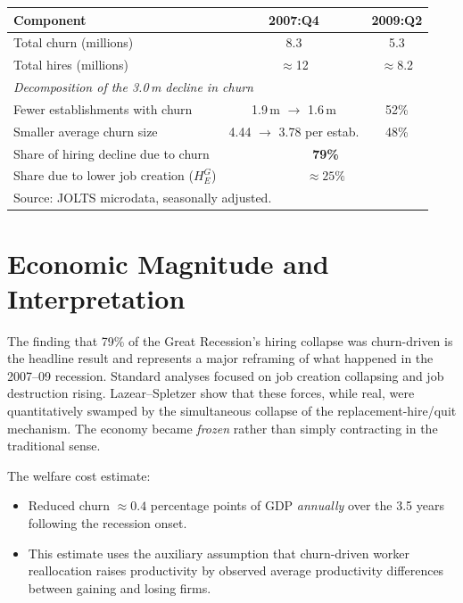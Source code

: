 \begin{center}
\begin{tabular}{lcc}
\toprule
\textbf{Component} & \textbf{2007:Q4} & \textbf{2009:Q2} \\
\midrule
Total churn (millions) & 8.3 & 5.3 \\
Total hires (millions) & $\approx$12 & $\approx$8.2 \\
\midrule
\multicolumn{3}{l}{\textit{Decomposition of the 3.0\,m decline in churn}} \\
Fewer establishments with churn & 1.9\,m $\to$ 1.6\,m & 52\% \\
Smaller average churn size & 4.44 $\to$ 3.78 per estab. & 48\% \\
\midrule
Share of hiring decline due to churn & \multicolumn{2}{c}{\textbf{79\%}} \\
Share due to lower job creation ($H^G_E$) & \multicolumn{2}{c}{$\approx25\%$} \\
\bottomrule
\multicolumn{3}{l}{\small Source: JOLTS microdata, seasonally adjusted.}
\end{tabular}
\end{center}

\section{Economic Magnitude and Interpretation}

The finding that 79\% of the Great Recession's hiring collapse was churn-driven
is the headline result and represents a major reframing of what happened in
the 2007--09 recession. Standard analyses focused on job creation collapsing
and job destruction rising. Lazear--Spletzer show that these forces, while
real, were quantitatively swamped by the simultaneous collapse of the
replacement-hire/quit mechanism. The economy became \emph{frozen} rather than
simply contracting in the traditional sense.

The welfare cost estimate:
\begin{itemize}
  \item Reduced churn $\approx 0.4$ percentage points of GDP \emph{annually}
    over the 3.5 years following the recession onset.
  \item This estimate uses the auxiliary assumption that churn-driven worker
    reallocation raises productivity by observed average productivity differences
    between gaining and losing firms.
\end{itemize}

